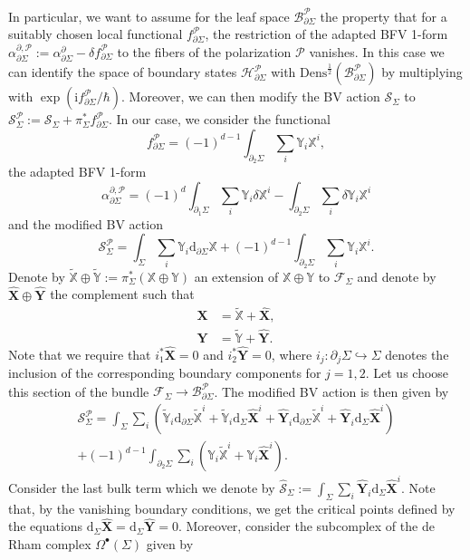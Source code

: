 \documentclass[11pt,colorinlistoftodos]{amsart}
\numberwithin{equation}{subsection}
\theoremstyle{plain}
\theoremstyle{definition}
\theoremstyle{remark}
\newcommand{\dd}{{\mathrm{d}}}
\newcommand{\de}{\partial}
\newcommand{\calB}{\mathcal{B}}
\newcommand{\calH}{\mathcal{H}}
\newcommand{\calS}{\mathcal{S}}
\newcommand{\calP}{\mathcal{P}}
\newcommand{\calF}{\mathcal{F}}
\newcommand{\I}{\mathrm{i}}
\begin{document}
In particular, we want to assume for the leaf space $\calB^\calP_{\de\Sigma}$ the property that for a suitably chosen local functional $f^\calP_{\de\Sigma}$, the restriction of the adapted BFV 1-form $\alpha^{\de,\calP}_{\de\Sigma}:=\alpha^\de_{\de\Sigma}-\delta f^\calP_{\de\Sigma}$ to the fibers of the polarization $\calP$ vanishes. In this case we can identify the space of boundary states $\calH^\calP_{\de\Sigma}$ with $\mathrm{Dens}^\frac{1}{2}(\calB^\calP_{\de\Sigma})$ by multiplying with $\exp(\I f^\calP_{\de\Sigma}/\hbar)$. Moreover, we can then modify the BV action $\calS_\Sigma$ to $\calS^\calP_\Sigma:=\calS_\Sigma+\pi^*_\Sigma f^\calP_{\de\Sigma}$. In our case, we consider the functional
\[
f^{\calP}_{\de\Sigma}=(-1)^{d-1}\int_{\de_2\Sigma}\sum_i\mathds{Y}_i\mathds{X}^i,
\]
the adapted BFV 1-form
\[
\alpha^{\de,\calP}_{\de\Sigma}=(-1)^d\int_{\de_1\Sigma}\sum_i\mathds{Y}_i\delta\mathds{X}^i-\int_{\de_2\Sigma}\sum_i\delta\mathds{Y}_i\mathds{X}^i
\]
and the modified BV action 
\[
\calS^\calP_\Sigma=\int_\Sigma \sum_i\mathds{Y}_i\dd_{\de\Sigma}\mathds{X}+(-1)^{d-1}\int_{\de_2\Sigma}\sum_i\mathds{Y}_i\mathds{X}^i.
\]
Denote by $\widetilde{\mathds{X}}\oplus\widetilde{\mathds{Y}}:=\pi^*_\Sigma(\mathds{X}\oplus\mathds{Y})$ an extension of $\mathds{X}\oplus\mathds{Y}$ to $\calF_\Sigma$ and denote by $\widehat{\mathbf{X}}\oplus\widehat{\mathbf{Y}}$ the complement such that 
\begin{align*}
    \mathbf{X}&=\widetilde{\mathds{X}}+\widehat{\mathbf{X}},\\
    \mathbf{Y}&=\widetilde{\mathds{Y}}+\widehat{\mathbf{Y}}.
\end{align*}
Note that we require that $i_1^*\widehat{\mathbf{X}}=0$ and $i_2^*\widehat{\mathbf{Y}}=0$, where $i_j\colon \de_j\Sigma\hookrightarrow \Sigma$ denotes the inclusion of the corresponding boundary components for $j=1,2$. Let us choose this section of the bundle $\calF_\Sigma\to \calB^\calP_{\de\Sigma}$. The modified BV action is then given by 
\begin{multline*}
\calS^\calP_\Sigma=\int_\Sigma\sum_i\left(\widetilde{\mathds{Y}}_i\dd_{\de\Sigma}\widetilde{\mathds{X}}^i+\widetilde{\mathds{Y}}_i\dd_{\Sigma}\widehat{\mathbf{X}}^i+\widehat{\mathbf{Y}}_i\dd_{\de\Sigma}\widetilde{\mathds{X}}^i+\widehat{\mathbf{Y}}_i\dd_\Sigma\widehat{\mathbf{X}}^i\right)\\
+(-1)^{d-1}\int_{\de_2\Sigma}\sum_i\left(\mathds{Y}_i\widetilde{\mathds{X}}^i+\mathds{Y}_i\widehat{\mathbf{X}}^i\right).
\end{multline*}
Consider the last bulk term which we denote by $\widehat{\calS}_\Sigma:=\int_\Sigma\sum_i\widehat{\mathbf{Y}}_i\dd_\Sigma\widehat{\mathbf{X}}^i$. Note that, by the vanishing boundary conditions, we get the critical points defined by the equations $\dd_\Sigma\widehat{\mathbf{X}}=\dd_\Sigma\widehat{\mathbf{Y}}=0$. Moreover, consider the subcomplex of the de Rham complex $\Omega^\bullet(\Sigma)$ given by 
\end{document}
